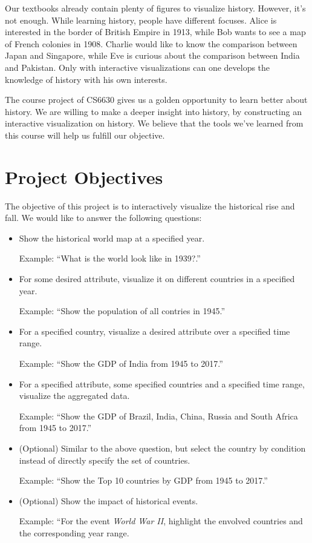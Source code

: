 \documentclass[12pt, fullpage,letterpaper]{article}
\begin{document}
Our textbooks already contain plenty of figures to visualize history. However,
it's not enough. While learning history, people have different focuses.  Alice
is interested in the border of British Empire in 1913, while Bob wants to see a
map of French colonies in 1908. Charlie would like to know the comparison
between Japan and Singapore, while Eve is curious about the comparison between
India and Pakistan.  Only with interactive visualizations can one develops the
knowledge of history with his own interests.

The course project of CS6630 gives us a golden opportunity to learn better
about history.  We are willing to make a deeper insight into history, by
constructing an interactive visualization on history. We believe that the tools
we've learned from this course will help us fulfill our objective.


\section{Project Objectives}
The objective of this project is to interactively visualize the historical rise
and fall.  We would like to answer the following questions:
\begin{itemize}
    \item Show the historical world map at a specified year.

        Example: ``What is the world look like in 1939?.''

    \item For some desired attribute, visualize it on different countries in a specified year.

        Example: ``Show the population of all contries in 1945.''

    \item For a specified country, visualize a desired attribute over a specified time range.

        Example: ``Show the GDP of India from 1945 to 2017.''

    \item For a specified attribute, some specified countries and a specified time range, visualize the aggregated data.

        Example: ``Show the GDP of Brazil, India, China, Russia and South Africa from 1945 to 2017.''

    \item (Optional) Similar to the above question, but select the country by condition instead of directly specify the set of countries.

        Example: ``Show the Top 10 countries by GDP from 1945 to 2017.''

    \item (Optional) Show the impact of historical events.

        Example: ``For the event \emph{World War II}, highlight the envolved countries and the corresponding year range.
\end{itemize}
\end{document}

